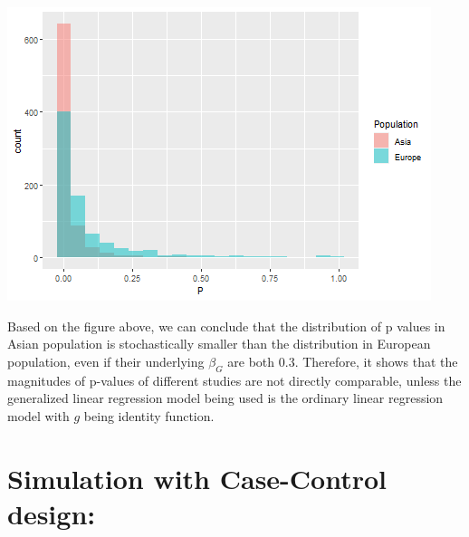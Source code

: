 \documentclass[
]{article}
\newenvironment{Shaded}{\begin{snugshade}}{\end{snugshade}}
\newcommand{\CommentTok}[1]{\textcolor[rgb]{0.56,0.35,0.01}{\textit{#1}}}
\newcommand{\DataTypeTok}[1]{\textcolor[rgb]{0.13,0.29,0.53}{#1}}
\newcommand{\DecValTok}[1]{\textcolor[rgb]{0.00,0.00,0.81}{#1}}
\newcommand{\FloatTok}[1]{\textcolor[rgb]{0.00,0.00,0.81}{#1}}
\newcommand{\KeywordTok}[1]{\textcolor[rgb]{0.13,0.29,0.53}{\textbf{#1}}}
\newcommand{\NormalTok}[1]{#1}
\newcommand{\OperatorTok}[1]{\textcolor[rgb]{0.81,0.36,0.00}{\textbf{#1}}}
\newcommand{\StringTok}[1]{\textcolor[rgb]{0.31,0.60,0.02}{#1}}
\begin{document}
\begin{Shaded}
\end{Shaded}

\includegraphics{GWAS-Pvalues_files/figure-latex/visualization-1.png}

Based on the figure above, we can conclude that the distribution of p
values in Asian population is stochastically smaller than the
distribution in European population, even if their underlying
\(\beta_G\) are both \(0.3\). Therefore, it shows that the magnitudes of
p-values of different studies are not directly comparable, unless the
generalized linear regression model being used is the ordinary linear
regression model with \(g\) being identity function.

\clearpage

\hypertarget{simulation-with-case-control-design}{%
\section{Simulation with Case-Control
design:}\label{simulation-with-case-control-design}}
\end{document}
